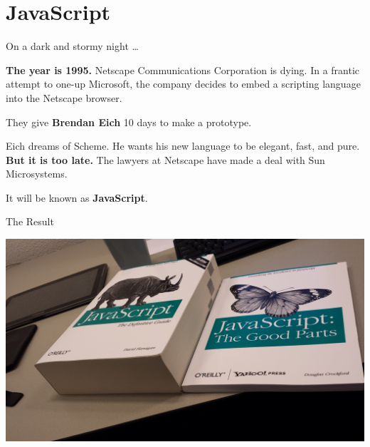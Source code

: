 \documentclass{lug}
\begin{document}
\renewcommand{\secimage}{graphics/sad_js}
\section{JavaScript}

\begin{frame}{On a dark and stormy night \dots}
    \begin{center}

        \textbf{The year is 1995.} Netscape Communications Corporation is
        dying. In a frantic attempt to one-up Microsoft, the company decides to
        embed a scripting language into the Netscape browser.
        
        \vspace{2ex}
        
        They give \textbf{Brendan Eich} 10 days to make a prototype.

        \vspace{2ex}

        Eich dreams of Scheme. He wants his new language to be elegant, fast,
        and pure. \textbf{But it is too late.} The lawyers at Netscape have made a deal
        with Sun Microsystems.

        \vspace{2ex}
        
        It will be known as \textbf{JavaScript}.
    \end{center}
\end{frame}

\begin{frame}{The Result}
    \begin{center}
        \includegraphics[width=\textwidth]{graphics/js_the_good}
    \end{center}
\end{frame}
\end{document}
